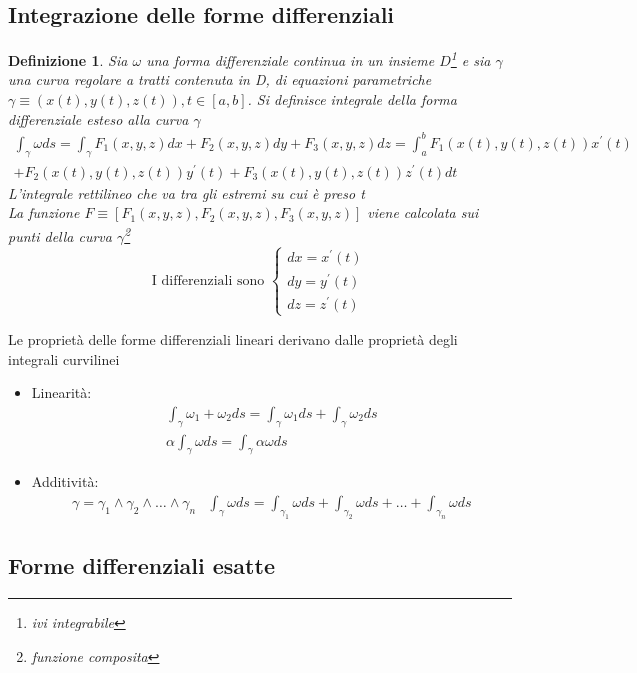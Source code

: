 \documentclass{book}
\newtheorem{defi}{Definizione}
\begin{document}
\subsection{Integrazione delle forme differenziali}
\begin{defi}
	Sia $\omega$ una forma differenziale continua in un insieme
	$D$\footnote{ivi integrabile} e sia $\gamma$ una curva regolare a tratti
	contenuta in D, di equazioni parametriche $\gamma \equiv (x(t),y(t), z(t)),
	t\in [a,b]$. Si definisce {\color{red}integrale della forma differenziale
	esteso alla curva $\gamma$}
	\begin{eqnarray*}
		\int_{\gamma} \omega ds=\int_{\gamma}
		F_1(x,y,z)dx+F_2(x,y,z)dy+F_3(x,y,z)dz=\int_{a}^{b}
		F_1(x(t),y(t),z(t))x^\prime (t)\\
		+F_2(x(t),y(t),z(t))y^\prime (t) + F_3(x(t),y(t),z(t))z^\prime (t)dt
	\end{eqnarray*}
	L'integrale rettilineo che va tra gli estremi su cui è preso t\\
	La funzione $F\equiv[F_1(x,y,z),F_2(x,y,z),F_3(x,y,z)]$ viene calcolata
	sui punti della curva $\gamma$\footnote{funzione composita}
	\begin{equation*}
		\text{I differenziali sono } \begin{cases}
			dx=x^\prime(t)\\
			dy=y^\prime(t)\\
			dz=z^\prime(t)
		\end{cases}
	\end{equation*}
\end{defi}
Le {\color{red} proprietà delle forme differenziali lineari} derivano dalle
proprietà degli integrali curvilinei
\begin{itemize}
	\item Linearità:
		\begin{eqnarray*}
			\int_{\gamma}\omega_1 +\omega_2 ds=\int_\gamma \omega_1ds
			+\int_\gamma \omega_2 ds\\
			\alpha\int_\gamma \omega ds=\int_\gamma \alpha \omega ds 
		\end{eqnarray*}
	\item Additività:
		\begin{eqnarray*}
			\gamma=\gamma_1\wedge \gamma_2\wedge \dots \wedge \gamma_n &
			\int_\gamma \omega ds =\int_{\gamma_1} \omega ds + \int_{\gamma_2}
			\omega ds + \dots +\int_{\gamma_n} \omega ds
		\end{eqnarray*}
\end{itemize}
\subsection{Forme differenziali esatte}

\printindex
\end{document}
